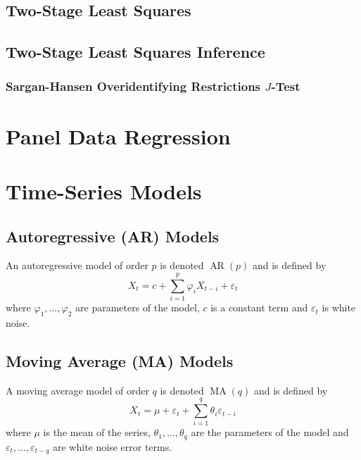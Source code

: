 \documentclass[11pt]{report} %
\begin{document}
\subsection{Two-Stage Least Squares}


\subsection{Two-Stage Least Squares Inference}


\subsubsection{Sargan-Hansen Overidentifying Restrictions $J$-Test \cite{Stock2015, Verbeek2017, Hill2011, Hayashi2000}}


\section{Panel Data Regression}

\section{Time-Series Models}

\subsection{Autoregressive (AR) Models}
An autoregressive model of order $p$ is denoted $\operatorname{AR}\left(p\right)$ and is defined by
\begin{equation}
X_{t} = c + \sum_{i = 1}^{p}\varphi_{i}X_{t - i} + \varepsilon_{t}
\end{equation}
where $\varphi_{1}, \dots, \varphi_{2}$ are parameters of the model, $c$ is a constant term and $\varepsilon_{t}$ is white noise.

\subsection{Moving Average (MA) Models}
A moving average model of order $q$ is denoted $\operatorname{MA}\left(q\right)$ and is defined by
\begin{equation}
X_{t} = \mu + \varepsilon_{t} + \sum_{i = 1}^{q}\theta_{i}\varepsilon_{t - i}
\end{equation}
where $\mu$ is the mean of the series, $\theta_{1}, \dots, \theta_{q}$ are the parameters of the model and $\varepsilon_{t}, \dots, \varepsilon_{t - q}$ are white noise error terms.
\end{document}
